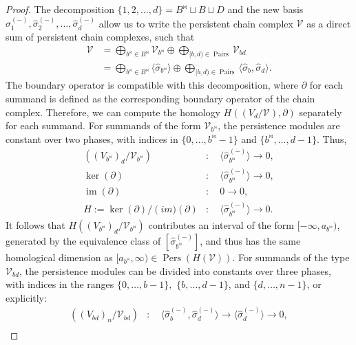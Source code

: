 \begin{proof}{\textit{\cite[Proof of Proposition 2.4]{de2011dualities}}}
The decomposition $\{1,2,\ldots,d\} = B^\Join \sqcup B \sqcup D$ and the new basis $\hat{\sigma}^{(-)}_1, \hat{\sigma}^{(-)}_2, \ldots, \hat{\sigma}^{(-)}_d$ allow us to write the persistent chain complex $\mathcal{V}$ as a direct sum of persistent chain complexes, such that
\begin{align}
	\mathcal{V} &= \bigoplus_{b^\Join \in B^\Join} \mathcal{V}_{b^\Join} \oplus \bigoplus_{[b,d) \in \operatorname{Pairs}} \mathcal{V}_{bd} \nonumber\\
	&= \bigoplus_{b^\Join \in B^\Join} \langle \hat{\sigma}_{b^\Join} \rangle \oplus \bigoplus_{[b,d) \in \operatorname{Pairs}} \langle \hat{\sigma}_{b}, \hat{\sigma}_{d} \rangle.
\end{align}
The boundary operator is compatible with this decomposition, where $\partial$ for each summand is defined as the corresponding boundary operator of the chain complex. Therefore, we can compute the homology $H((V_d/\mathcal{V}),\partial)$ separately for each summand. For summands of the form $\mathcal{V}_{b^\Join}$, the persistence modules are constant over two phases, with indices in $\{0,\ldots,b^\Join - 1\}$ and $\{b^\Join, \ldots, d-1\}$. Thus,
\begin{align}
	((V_{b^{\Join}})_d/\mathcal{V}_{b^\Join})&: \quad \langle \hat{\sigma}^{(-)}_{b^\Join}\rangle \rightarrow 0,\nonumber\\
	\ker(\partial)&: \quad \langle \hat{\sigma}^{(-)}_{b^\Join}\rangle \rightarrow 0,\nonumber\\
	\operatorname{im}(\partial)&: \quad 0 \rightarrow 0,\nonumber\\
	H := \ker(\partial) / \operatorname(im)(\partial)&: \quad \langle \hat{\sigma}^{(-)}_{b^\Join}\rangle \rightarrow 0.
\end{align}
It follows that $H((V_{b^\Join})_d/\mathcal{V}_{b^\Join})$ contributes an interval of the form $[-\infty, a_{b^\Join})$, generated by the equivalence class of $[\hat{\sigma}^{(-)}_{b^\Join}]$, and thus has the same homological dimension as $[a_{b^{\Join}}, \infty) \in \operatorname{Pers}(H(\mathcal{V}))$. For summands of the type $\mathcal{V}_{bd}$, the persistence modules can be divided into constants over three phases, with indices in the ranges $\{0,\ldots,b-1\},$ $\{b,\ldots,d-1\}$, and $\{d,\ldots, n-1\}$, or explicitly:
\begin{align}
((V_{bd})_n/\mathcal{V}_{bd}) &: \quad \langle \hat{\sigma}^{(-)}_b, \hat{\sigma}^{(-)}_d \rangle \rightarrow \langle \hat{\sigma}^{(-)}_d \rangle \rightarrow 0,\nonumber\\

\end{align}
\end{proof}
